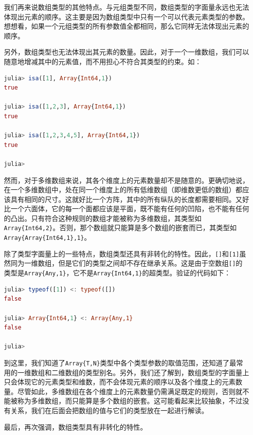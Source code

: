我们再来说数组类型的其他特点。与元组类型不同，数组类型的字面量永远也无法体现出元素的顺序。这主要是因为数组类型中只有一个可以代表元素类型的参数。想想看，如果一个元组类型的所有参数值全都相同，那么它同样无法体现出元素的顺序。

另外，数组类型也无法体现出其元素的数量。因此，对于一个一维数组，我们可以随意地增减其中的元素值，而不用担心不符合其类型的约束。如：

\begin{lstlisting}[language=julia]
julia> isa([1], Array{Int64,1})
true

julia> isa([1,2,3], Array{Int64,1})
true

julia> isa([1,2,3,4,5], Array{Int64,1})
true

julia> 
\end{lstlisting}

然而，对于多维数组来说，其各个维度上的元素数量却不是随意的。更确切地说，在一个多维数组中，处在同一个维度上的所有低维数组（即维数更低的数组）都应该具有相同的尺寸。这就好比一个方阵，其中的所有纵队的长度都需要相同。又好比一个六面体，它的每一个面都应该是平面，既不能有任何的凹陷，也不能有任何的凸出。只有符合这种规则的数组才能被称为多维数组，其类型如\verb`Array{Int64,2}`。否则，那个数组就只能算是多个数组的嵌套而已，其类型如\verb`Array{Array{Int64,1},1}`。

除了类型字面量上的一些特点，数组类型还具有非转化的特性。因此，\verb`[]`和\verb`[1]`虽然同为一维数组，但是它们的类型之间却不存在继承关系。这是由于空数组\verb`[]`的类型是\verb`Array{Any,1}`，它不是\verb`Array{Int64,1}`的超类型。验证的代码如下：

\begin{lstlisting}[language=julia]
julia> typeof([1]) <: typeof([])
false

julia> Array{Int64,1} <: Array{Any,1}
false

julia> 
\end{lstlisting}

到这里，我们知道了\verb`Array{T,N}`类型中各个类型参数的取值范围，还知道了最常用的一维数组和二维数组的类型别名。另外，我们还了解到，数组类型的字面量上只会体现它的元素类型和维数，而不会体现元素的顺序以及各个维度上的元素数量。尽管如此，多维数组在各个维度上的元素数量仍需满足既定的规则，否则就不能被称为多维数组，而只能算是多个数组的嵌套。这可能看起来比较抽象，不过没有关系，我们在后面会把数组的值与它们的类型放在一起进行解读。

最后，再次强调，数组类型具有非转化的特性。

